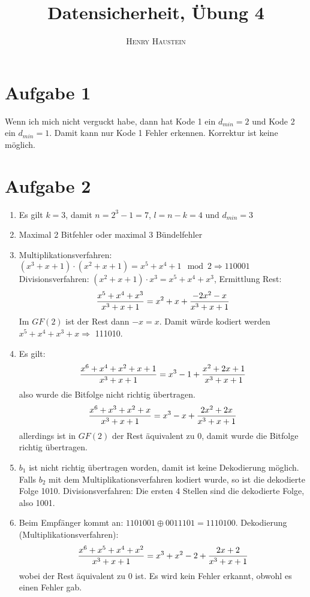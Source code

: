 \documentclass{article}
\title{\textbf{Datensicherheit, Übung 4}}
\author{\textsc{Henry Haustein}}
\date{}
\begin{document}
	\maketitle
	
	\section*{Aufgabe 1}
	Wenn ich mich nicht verguckt habe, dann hat Kode 1 ein $d_{min}=2$ und Kode 2 ein $d_{min}=1$. Damit kann nur Kode 1 Fehler erkennen. Korrektur ist keine möglich.

	\section*{Aufgabe 2}
	\begin{enumerate}[label=(\alph*)]
		\item Es gilt $k=3$, damit $n = 2^3-1 = 7$, $l=n-k = 4$ und $d_{min} = 3$
		\item Maximal 2 Bitfehler oder maximal 3 Bündelfehler
		\item Multiplikationsverfahren: $(x^3+x+1)\cdot (x^2+x+1) = x^5 + x^4 + 1\mod 2\Rightarrow 110001$ \\
		Divisionsverfahren: $(x^2+x+1)\cdot x^3 = x^5+x^4+x^3$, Ermittlung Rest:
		\begin{align}
			\frac{x^5+x^4+x^3}{x^3+x+1} = x^2+x + \frac{-2x^2-x}{x^3+x+1} \notag
		\end{align}
		Im $GF(2)$ ist der Rest dann $-x = x$. Damit würde kodiert werden $x^5+x^4+x^3 + x \Rightarrow$ 111010.
		\item Es gilt:
		\begin{align}
			\frac{x^6+x^4+x^2+x+1}{x^3+x+1} = x^3-1 + \frac{x^2+2x+1}{x^3+x+1} \notag
		\end{align}
		also wurde die Bitfolge nicht richtig übertragen.
		\begin{align}
			\frac{x^6+x^3+x^2+x}{x^3+x+1} = x^3-x + \frac{2x^2+2x}{x^3+x+1} \notag
		\end{align}
		allerdings ist in $GF(2)$ der Rest äquivalent zu 0, damit wurde die Bitfolge richtig übertragen.
		\item $b_1$ ist nicht richtig übertragen worden, damit ist keine Dekodierung möglich. \\
		Falls $b_2$ mit dem Multiplikationsverfahren kodiert wurde, so ist die dekodierte Folge 1010. Divisionsverfahren: Die ersten 4 Stellen sind die dekodierte Folge, also 1001.
		\item Beim Empfänger kommt an: $1101001 \oplus 0011101 = 1110100$. Dekodierung (Multiplikationsverfahren):
		\begin{align}
			\frac{x^6+x^5+x^4+x^2}{x^3+x+1} = x^3+x^2-2 + \frac{2x+2}{x^3+x+1} \notag
		\end{align}
		wobei der Rest äquivalent zu 0 ist. Es wird kein Fehler erkannt, obwohl es einen Fehler gab.
	\end{enumerate}
	
\end{document}
